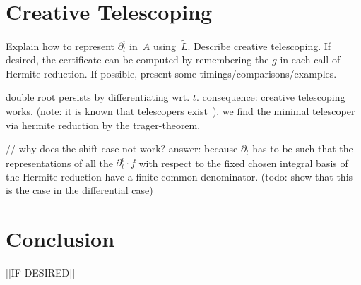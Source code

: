 \documentclass{sig-alternate}
\begin{document}
\section{Creative Telescoping}

Explain how to represent $\partial_t^i$ in~$A$ using~$\tilde{L}$.
Describe creative telescoping.
If desired, the certificate can be computed by remembering the $g$ in each call of Hermite reduction.
If possible, present some timings/comparisons/examples.

double root persists by differentiating wrt. $t$. consequence: creative telescoping works.
(note: it is known that telescopers exist~\cite{zeilberger90,chyzak00}).
we find the minimal telescoper via hermite reduction by the trager-theorem.

// why does the shift case not work? answer: because $\partial_t$ has to be such that the representations of all the $\partial_t^i\cdot f$
with respect to the fixed chosen integral basis of the Hermite reduction have a finite common denominator.
(todo: show that this is the case in the differential case)


\section{Conclusion}

[[IF DESIRED]]



\end{document}
